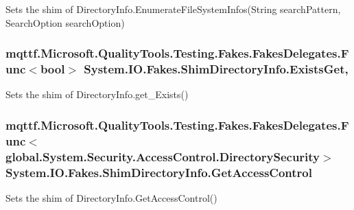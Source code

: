 Sets the shim of Directory\-Info.\-Enumerate\-File\-System\-Infos(\-String search\-Pattern, Search\-Option search\-Option)

\hypertarget{class_system_1_1_i_o_1_1_fakes_1_1_shim_directory_info_ae82ab47403ebab11ec40bcaefac74dbd}{
\subsubsection[{Exists\-Get}]{\setlength{\rightskip}{0pt plus 5cm}mqttf.\-Microsoft.\-Quality\-Tools.\-Testing.\-Fakes.\-Fakes\-Delegates.\-Func$<$bool$>$ System.\-I\-O.\-Fakes.\-Shim\-Directory\-Info.\-Exists\-Get\hspace{0.3cm}{\ttfamily [get]}, {\ttfamily [set]}}}\label{class_system_1_1_i_o_1_1_fakes_1_1_shim_directory_info_ae82ab47403ebab11ec40bcaefac74dbd}


Sets the shim of Directory\-Info.\-get\-\_\-\-Exists()

\hypertarget{class_system_1_1_i_o_1_1_fakes_1_1_shim_directory_info_aa411d3d2ad8cf4b51aeca0dd475ba9b6}{
\subsubsection[{Get\-Access\-Control}]{\setlength{\rightskip}{0pt plus 5cm}mqttf.\-Microsoft.\-Quality\-Tools.\-Testing.\-Fakes.\-Fakes\-Delegates.\-Func$<$global.\-System.\-Security.\-Access\-Control.\-Directory\-Security$>$ System.\-I\-O.\-Fakes.\-Shim\-Directory\-Info.\-Get\-Access\-Control\hspace{0.3cm}{\ttfamily [set]}}}\label{class_system_1_1_i_o_1_1_fakes_1_1_shim_directory_info_aa411d3d2ad8cf4b51aeca0dd475ba9b6}


Sets the shim of Directory\-Info.\-Get\-Access\-Control()

